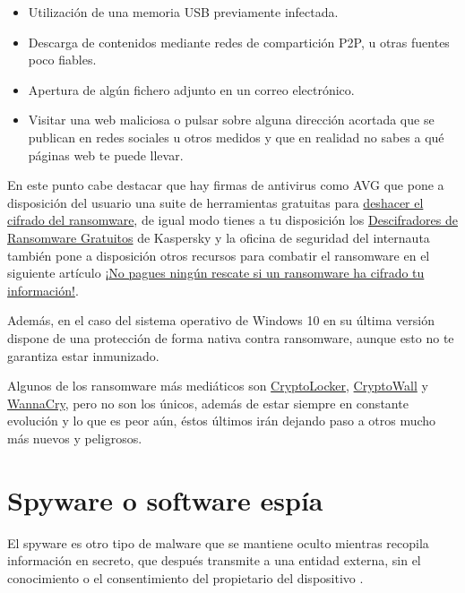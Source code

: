 \documentclass[
  a4paper,
  openany]{book}
\begin{document}
\begin{itemize}
\item
  Utilización de una memoria USB previamente infectada.
\item
  Descarga de contenidos mediante redes de compartición P2P, u otras fuentes poco fiables.
\item
  Apertura de algún fichero adjunto en un correo electrónico.
\item
  Visitar una web maliciosa o pulsar sobre alguna dirección acortada que se publican en redes sociales u otros medidos y que en realidad no sabes a qué páginas web te puede llevar.
\end{itemize}

En este punto cabe destacar que hay firmas de antivirus como AVG que pone a disposición del usuario una suite de herramientas gratuitas para \href{https://www.avg.com/es-es/ransomware-decryption-tools}{deshacer el cifrado del ransomware}, de igual modo tienes a tu disposición los \href{https://noransom.kaspersky.com/es/}{Descifradores de Ransomware Gratuitos} de Kaspersky y la oficina de seguridad del internauta también pone a disposición otros recursos para combatir el ransomware en el siguiente artículo \href{https://www.osi.es/es/actualidad/blog/2022/11/17/no-pagues-ningun-rescate-si-un-ransomware-ha-cifrado-tu-informacion}{¡No pagues ningún rescate si un ransomware ha cifrado tu información!}.

Además, en el caso del sistema operativo de Windows 10 en su última versión dispone de una protección de forma nativa contra ransomware, aunque esto no te garantiza estar inmunizado.

Algunos de los ransomware más mediáticos son \href{https://es.wikipedia.org/wiki/CryptoLocker}{CryptoLocker}, \href{https://es.wikipedia.org/wiki/Ransomware\#CryptoWall}{CryptoWall} y \href{https://es.wikipedia.org/wiki/WannaCry}{WannaCry}, pero no son los únicos, además de estar siempre en constante evolución y lo que es peor aún, éstos últimos irán dejando paso a otros mucho más nuevos y peligrosos.

\hypertarget{spyware-o-software-espuxeda}{%
\section{Spyware o software espía}\label{spyware-o-software-espuxeda}}

El spyware es otro tipo de malware que se mantiene oculto mientras recopila información en secreto, que después transmite a una entidad externa, sin el conocimiento o el consentimiento del propietario del dispositivo \citep{AVAST-spyware}.
\end{document}

